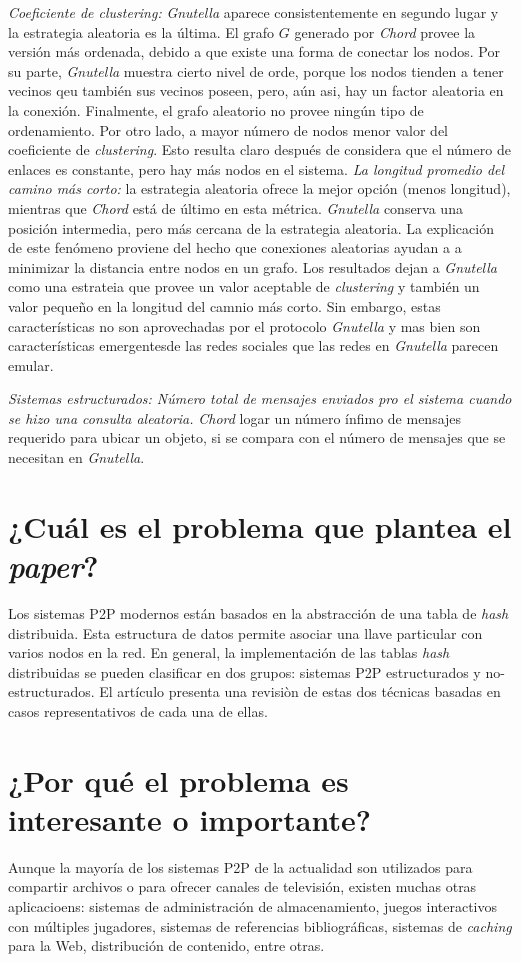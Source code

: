 \emph{Coeficiente de clustering:} \emph{Gnutella} aparece consistentemente en segundo lugar y la estrategia aleatoria es la última. El grafo $G$ generado por \emph{Chord} provee la versión más ordenada, debido a que existe una forma de conectar los nodos. Por su parte, \emph{Gnutella} muestra cierto nivel de orde, porque los nodos tienden a tener vecinos qeu también sus vecinos poseen, pero, aún asi, hay un factor aleatoria en la conexión. Finalmente, el grafo aleatorio no provee ningún tipo de ordenamiento. Por otro lado, a mayor número de nodos menor valor del coeficiente de \emph{clustering}. Esto resulta claro después de considera que el número de enlaces es constante, pero hay más nodos en el sistema. \emph{La longitud promedio del camino más corto:} la estrategia aleatoria ofrece la mejor opción (menos longitud), mientras que \emph{Chord} está de último en esta métrica. \emph{Gnutella} conserva una posición intermedia, pero más cercana de la estrategia aleatoria. La explicación de este fenómeno proviene del hecho que conexiones aleatorias ayudan a a minimizar la distancia entre nodos en un grafo. Los resultados dejan a \emph{Gnutella} como una estrateia que provee un valor aceptable de \emph{clustering} y también un valor pequeño en la longitud del camnio más corto. Sin embargo, estas características no son aprovechadas por el protocolo \emph{Gnutella} y mas bien son características emergentesde las redes sociales que las redes en \emph{Gnutella} parecen emular.


\emph{Sistemas estructurados: Número total de mensajes enviados pro el sistema cuando se hizo una consulta aleatoria.} \emph{Chord} logar un número ínfimo de mensajes requerido para ubicar un objeto, si se compara con el número de mensajes que se necesitan en \emph{Gnutella}.

\section{¿Cuál es el problema que plantea el \textit{paper}?}
Los sistemas P2P modernos están basados en la abstracción de una tabla de \emph{hash} distribuida. Esta estructura de datos permite asociar una llave particular con varios nodos en la red. En general, la implementación de las tablas \emph{hash} distribuidas se pueden clasificar en dos grupos: sistemas P2P estructurados y no-estructurados. El artículo presenta una revisiòn de estas dos técnicas basadas en casos representativos de cada una de ellas.

\section{¿Por qué el problema es interesante o importante?}
Aunque la mayoría de los sistemas P2P de la actualidad son utilizados para compartir archivos o para ofrecer canales de televisión, existen muchas otras aplicacioens: sistemas de administración de almacenamiento, juegos interactivos con múltiples jugadores, sistemas de referencias bibliográficas, sistemas de \emph{caching} para la Web, distribución de contenido, entre otras.

